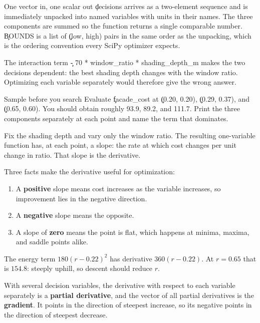 \begin{SyntaxBox}{One vector in, one scalar out}
\c{decisions} arrives as a two-element sequence and is immediately unpacked into
named variables with units in their names. The three components are summed so
the function returns a single comparable number. \c{BOUNDS} is a list of
\c{(low, high)} pairs in the same order as the unpacking, which is the ordering
convention every SciPy optimizer expects.
\end{SyntaxBox}

The interaction term \c{- 70 * window_ratio * shading_depth_m} makes the two
decisions dependent: the best shading depth changes with the window ratio.
Optimizing each variable separately would therefore give the wrong answer.

\begin{TryBox}{Sample before you search}
Evaluate \c{facade_cost} at \c{(0.20, 0.20)}, \c{(0.29, 0.37)}, and
\c{(0.65, 0.60)}. You should obtain roughly 93.9, 89.2, and 111.7. Print the
three components separately at each point and name the term that dominates.
\end{TryBox}


Fix the shading depth and vary only the window ratio. The resulting
one-variable function has, at each point, a slope: the rate at which cost
changes per unit change in ratio. That slope is the derivative.

Three facts make the derivative useful for optimization:

\begin{enumerate}
    \item A \textbf{positive} slope means cost increases as the variable
          increases, so improvement lies in the negative direction.
    \item A \textbf{negative} slope means the opposite.
    \item A slope of \textbf{zero} means the point is flat, which happens at
          minima, maxima, and saddle points alike.
\end{enumerate}

The energy term $180(r - 0.22)^2$ has derivative $360(r - 0.22)$. At $r = 0.65$
that is $154.8$: steeply uphill, so descent should reduce $r$.


With several decision variables, the derivative with respect to each variable
separately is a \textbf{partial derivative}, and the vector of all partial
derivatives is the \textbf{gradient}. It points in the direction of steepest
increase, so its negative points in the direction of steepest decrease.

